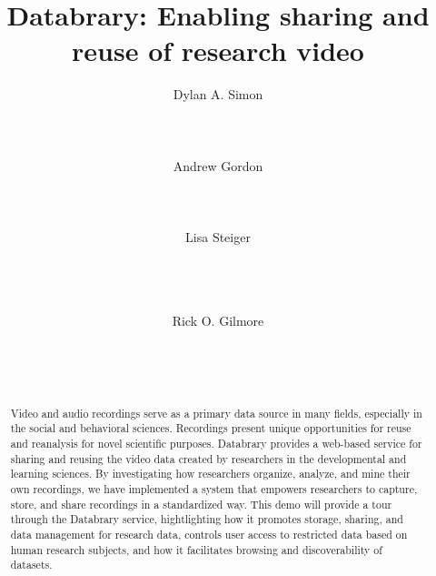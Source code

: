 \documentclass{sig-alternate}
\begin{document}

\title{Databrary: Enabling sharing and reuse of research video}


\author{
\alignauthor
Dylan A. Simon\\
	\\
	\\
	\\
\alignauthor
Andrew Gordon\\
	\\
	\\
	\\
\alignauthor
Lisa Steiger\\
	\\
	\\
	\\
\and
Rick O. Gilmore\\
	\\
	\\
	\\
}

\maketitle

\begin{abstract}
Video and audio recordings serve as a primary data source in many fields, especially in the social and behavioral sciences.
Recordings present unique opportunities for reuse and reanalysis for novel scientific purposes.
Databrary provides a web-based service for sharing and reusing the video data created by researchers in the developmental and learning sciences.
By investigating how researchers organize, analyze, and mine their own recordings, we have implemented a system that empowers researchers to capture, store, and share recordings in a standardized way.
This demo will provide a tour through the Databrary service, hightlighting how it promotes storage, sharing, and data management for research data, controls user access to restricted data based on human research subjects, and how it facilitates browsing and discoverability of datasets.
\end{abstract}
\end{document}
